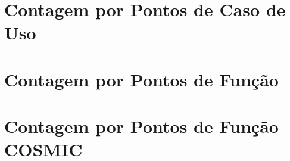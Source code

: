 \chapter{Contagem por Pontos de Caso de Uso}

  

\chapter{Contagem por Pontos de Função}

  

\chapter{Contagem por Pontos de Função COSMIC}

  